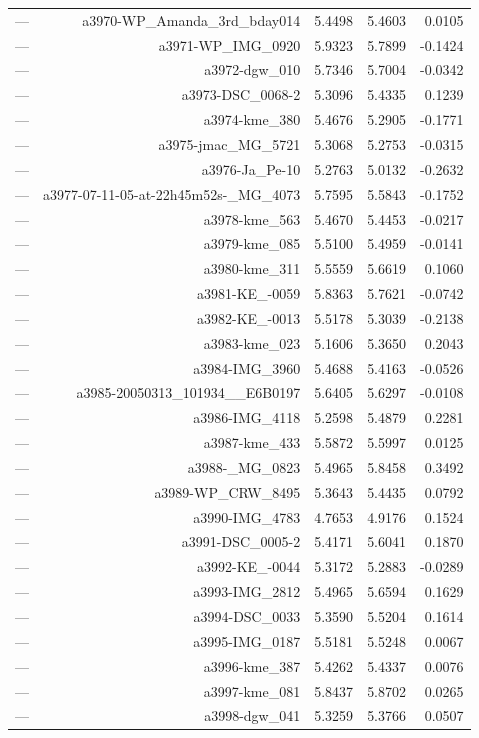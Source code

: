\begin{table}[htbp]
\begin{tabular}{lrrrr}
— & a3970-WP_Amanda_3rd_bday014 & 5.4498 & 5.4603 & 0.0105 \\
— & a3971-WP_IMG_0920 & 5.9323 & 5.7899 & -0.1424 \\
— & a3972-dgw_010 & 5.7346 & 5.7004 & -0.0342 \\
— & a3973-DSC_0068-2 & 5.3096 & 5.4335 & 0.1239 \\
— & a3974-kme_380 & 5.4676 & 5.2905 & -0.1771 \\
— & a3975-jmac_MG_5721 & 5.3068 & 5.2753 & -0.0315 \\
— & a3976-Ja_Pe-10 & 5.2763 & 5.0132 & -0.2632 \\
— & a3977-07-11-05-at-22h45m52s-_MG_4073 & 5.7595 & 5.5843 & -0.1752 \\
— & a3978-kme_563 & 5.4670 & 5.4453 & -0.0217 \\
— & a3979-kme_085 & 5.5100 & 5.4959 & -0.0141 \\
— & a3980-kme_311 & 5.5559 & 5.6619 & 0.1060 \\
— & a3981-KE_-0059 & 5.8363 & 5.7621 & -0.0742 \\
— & a3982-KE_-0013 & 5.5178 & 5.3039 & -0.2138 \\
— & a3983-kme_023 & 5.1606 & 5.3650 & 0.2043 \\
— & a3984-IMG_3960 & 5.4688 & 5.4163 & -0.0526 \\
— & a3985-20050313_101934__E6B0197 & 5.6405 & 5.6297 & -0.0108 \\
— & a3986-IMG_4118 & 5.2598 & 5.4879 & 0.2281 \\
— & a3987-kme_433 & 5.5872 & 5.5997 & 0.0125 \\
— & a3988-_MG_0823 & 5.4965 & 5.8458 & 0.3492 \\
— & a3989-WP_CRW_8495 & 5.3643 & 5.4435 & 0.0792 \\
— & a3990-IMG_4783 & 4.7653 & 4.9176 & 0.1524 \\
— & a3991-DSC_0005-2 & 5.4171 & 5.6041 & 0.1870 \\
— & a3992-KE_-0044 & 5.3172 & 5.2883 & -0.0289 \\
— & a3993-IMG_2812 & 5.4965 & 5.6594 & 0.1629 \\
— & a3994-DSC_0033 & 5.3590 & 5.5204 & 0.1614 \\
— & a3995-IMG_0187 & 5.5181 & 5.5248 & 0.0067 \\
— & a3996-kme_387 & 5.4262 & 5.4337 & 0.0076 \\
— & a3997-kme_081 & 5.8437 & 5.8702 & 0.0265 \\
— & a3998-dgw_041 & 5.3259 & 5.3766 & 0.0507 \\

\end{tabular}
\end{table}
